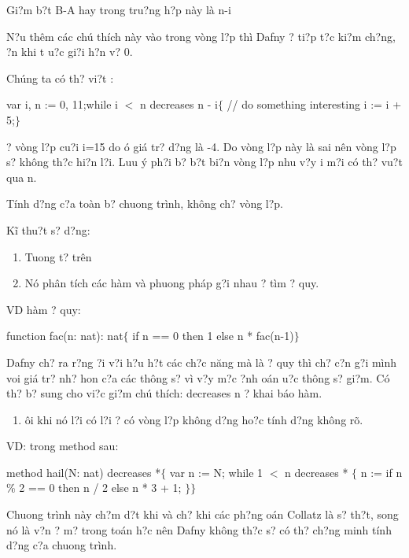 \documentclass{article} %
\begin{document}
\noindent Gi?m b?t B-A hay trong tru?ng h?p n\`{a}y l\`{a} n-i

\noindent N?u th\^{e}m c\'{a}c ch\'{u} th\'{i}ch n\`{a}y v\`{a}o trong v\`{o}ng l?p th\`{i} Dafny {\dj}? ti?p t?c ki?m ch?ng, {\dj}?n khi t {\dj}u?c gi?i h?n v? 0.

\noindent Ch\'{u}ng ta c\'{o} th? vi?t :

\noindent var i, n := 0, 11;while i $<$ n   decreases n - i$\{$   // do something interesting   i := i + 5;$\}$\textbf{}

? v\`{o}ng l?p cu?i i=15 do {\dj}\'{o} gi\'{a} tr? d?ng l\`{a} -4. Do v\`{o}ng l?p n\`{a}y l\`{a} sai n\^{e}n v\`{o}ng l?p s? kh\^{o}ng th?c hi?n l?i. Luu \'{y} ph?i b? b?t bi?n v\`{o}ng l?p nhu v?y i m?i c\'{o} th? vu?t qua n.

\noindent T\'{i}nh d?ng c?a to\`{a}n b? chuong tr\`{i}nh, kh\^{o}ng ch? v\`{o}ng l?p.

\noindent K\~{i} thu?t s? d?ng:

\begin{enumerate}
\item  Tuong t? tr\^{e}n

\item  N\'{o} ph\^{a}n t\'{i}ch c\'{a}c h\`{a}m v\`{a} phuong ph\'{a}p g?i nhau {\dj}? t\`{i}m {\dj}? quy. 
\end{enumerate}

VD h\`{a}m {\dj}? quy:

function fac(n: nat): nat$\{$   if n == 0 then 1 else n * fac(n-1)$\}$\textbf{}

Dafny ch? ra r?ng {\dj}?i v?i h?u h?t c\'{a}c ch?c n\u{a}ng m\`{a} l\`{a} {\dj}? quy th\`{i} ch? c?n g?i m\`{i}nh voi gi\'{a} tr? nh? hon c?a c\'{a}c th\^{o}ng s? v\`{i} v?y m?c {\dj}?nh {\dj}o\'{a}n {\dj}u?c th\^{o}ng s? gi?m. C\'{o} th? b? sung cho vi?c gi?m ch\'{u} th\'{i}ch:  decreases n {\dj}? khai b\'{a}o h\`{a}m. 

\begin{enumerate}
\item  {\DJ}\^{o}i khi n\'{o} l?i c\'{o} l?i {\dj}? c\'{o} v\`{o}ng l?p kh\^{o}ng d?ng ho?c t\'{i}nh d?ng kh\^{o}ng r\~{o}. 
\end{enumerate}

\noindent VD: trong method sau:

method hail(N: nat)   decreases *$\{$   var n := N;   while 1 $<$ n      decreases *   $\{$      n := if n \% 2 == 0 then n / 2 else n * 3 + 1;   $\}$$\}$\textbf{}

Chuong tr\`{i}nh n\`{a}y ch?m d?t khi v\`{a} ch? khi c\'{a}c ph?ng {\dj}o\'{a}n Collatz l\`{a} s? th?t, song n\'{o} l\`{a} v?n {\dj}? m? trong to\'{a}n h?c n\^{e}n Dafny kh\^{o}ng th?c s? c\'{o} th? ch?ng minh t\'{i}nh d?ng c?a chuong tr\`{i}nh.
\end{document}
